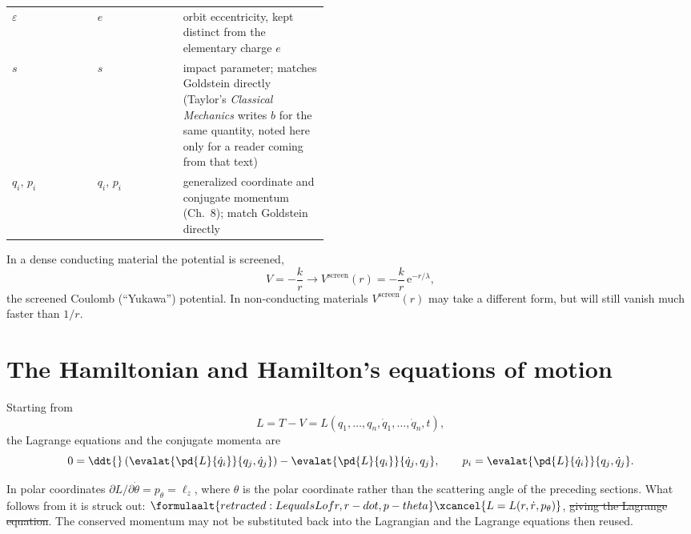 \documentclass[11pt]{article}
\newcommand{\ee}{\mathrm{e}}   %
\begin{document}
\begin{table}[H]
\begin{tabular}{ll>{\raggedright\arraybackslash}p{0.46\linewidth}}
    $\varepsilon$ & $e$                & orbit eccentricity, kept distinct from
                                         the elementary charge $e$ \\
    $s$           & $s$                & impact parameter; matches Goldstein
                                         directly (Taylor's \emph{Classical
                                         Mechanics} writes $b$ for the same
                                         quantity, noted here only for a reader
                                         coming from that text) \\
    $q_i,\,p_i$   & $q_i,\,p_i$        & generalized coordinate and conjugate
                                         momentum (Ch.~8); match Goldstein
                                         directly \\
    \bottomrule
  \end{tabular}
\end{table}

\begin{caveat}
In a dense conducting material the potential is screened,
%
\begin{equation}\label{eq:yukawa}
  V = -\frac{k}{r} \longrightarrow
  V^{\mathrm{screen}}(r) = -\frac{k}{r}\,\ee^{-r/\lambda},
\end{equation}
%
the screened Coulomb (``Yukawa'') potential. In non-conducting materials
$V^{\mathrm{screen}}(r)$ may take a different form, but will still vanish much
faster than $1/r$.
\end{caveat}

\section{The Hamiltonian and Hamilton's equations of motion}

Starting from
%
\begin{equation}\label{eq:lagrangian}
  L = T - V = L(q_1,\dots,q_n,\dot q_1,\dots,\dot q_n,t),
\end{equation}
%
the Lagrange equations and the conjugate momenta are
%
\begin{equation}\label{eq:lagrange-eq}
  0 = \ddt{}\left(\evalat{\pd{L}{\dot q_i}}{q_j,\dot q_j}\right)
      - \evalat{\pd{L}{q_i}}{\dot q_j,q_j},
  \qquad
  p_i = \evalat{\pd{L}{\dot q_i}}{q_j,\dot q_j} .
\end{equation}

\begin{remark}
In polar coordinates $\partial L/\partial\dot\theta = p_\theta = \ell_z$,
where $\theta$ is the polar coordinate rather than the scattering angle of the
preceding sections. What follows from it is struck out:
$\formulaalt{retracted: L equals L of r, r-dot, p-theta}%
\xcancel{L = L(r,\dot r,p_\theta)}$,
\sout{giving the Lagrange equation}. The conserved momentum may not be
substituted back into the Lagrangian and the Lagrange equations then reused.
\end{remark}
\end{document}
